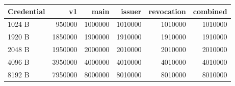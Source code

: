 \begin{tabular}{lrrrrr}
\toprule
Credential & v1 & main & issuer & revocation & combined \\
\midrule
1024 B & 950000 & 1000000 & 1010000 & 1010000 & 1010000 \\
1920 B & 1850000 & 1900000 & 1910000 & 1910000 & 1910000 \\
2048 B & 1950000 & 2000000 & 2010000 & 2010000 & 2010000 \\
4096 B & 3950000 & 4000000 & 4010000 & 4010000 & 4010000 \\
8192 B & 7950000 & 8000000 & 8010000 & 8010000 & 8010000 \\
\bottomrule
\end{tabular}
